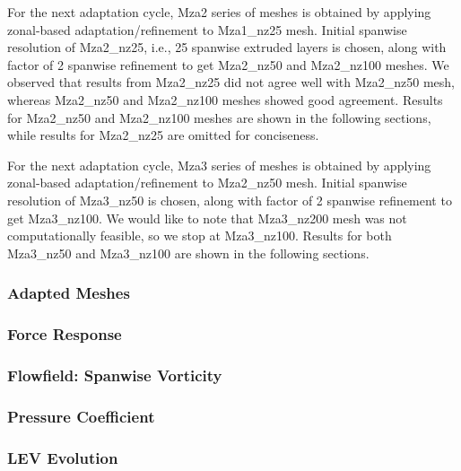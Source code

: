 For the next adaptation cycle, Mza2 series of meshes is obtained by applying  zonal-based adaptation/refinement to Mza1\_nz25 mesh.
Initial spanwise resolution of Mza2\_nz25, i.e., 25 spanwise extruded layers is chosen, along with factor of 2 spanwise refinement to get Mza2\_nz50 and Mza2\_nz100 meshes. 
We observed that results from Mza2\_nz25 did not agree well with Mza2\_nz50 mesh, whereas Mza2\_nz50 and Mza2\_nz100 meshes showed good agreement.
Results for Mza2\_nz50 and Mza2\_nz100 meshes are shown in the following sections, while results for Mza2\_nz25 are omitted for conciseness.

For the next adaptation cycle, Mza3 series of meshes is obtained by applying  zonal-based adaptation/refinement to Mza2\_nz50 mesh. 
Initial spanwise resolution of Mza3\_nz50 is chosen, along with factor of 2 spanwise refinement to get Mza3\_nz100. 
We would like to note that Mza3\_nz200 mesh was not computationally feasible, so we stop at Mza3\_nz100.
Results for both Mza3\_nz50 and Mza3\_nz100 are shown in the following sections.

\subsubsection{Adapted Meshes}

\label{sec:zonal_mesh_and_error}

\subsubsection{Force Response}

\label{sec:zonal_force_response}

\subsubsection{Flowfield: Spanwise Vorticity}

\label{sec:zonal_vorticity}

\subsubsection{Pressure Coefficient}

\label{sec:zonal_cp}

\subsubsection{LEV Evolution}

\label{sec:zonal_LEV}



%

